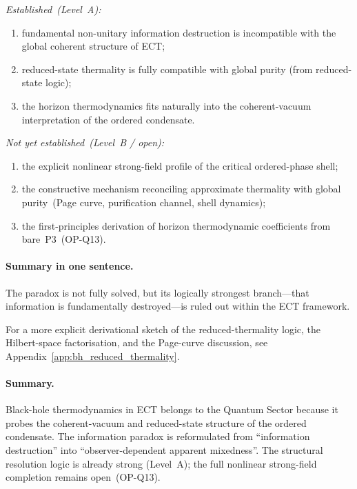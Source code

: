 \documentclass[11pt,a4paper]{article}
\numberwithin{equation}{section}
\begin{document}
\textit{Established~(Level~A):}
\begin{enumerate}[label=(\roman*)]
  \item fundamental non-unitary information destruction is
    incompatible with the global coherent structure of ECT;
  \item reduced-state thermality is fully compatible with global
    purity (from reduced-state logic);
  \item the horizon thermodynamics fits naturally into the
    coherent-vacuum interpretation of the ordered condensate.
\end{enumerate}

\textit{Not yet established~(Level~B / open):}
\begin{enumerate}[label=(\roman*)]
  \item the explicit nonlinear strong-field profile of the
    critical ordered-phase shell;
  \item the constructive mechanism reconciling approximate
    thermality with global purity~(Page curve, purification
    channel, shell dynamics);
  \item the first-principles derivation of horizon thermodynamic
    coefficients from bare~P3~(OP-Q13).
\end{enumerate}

\paragraph{Summary in one sentence.}
The paradox is not fully solved, but its logically strongest
branch---that information is fundamentally destroyed---is ruled
out within the ECT framework.

For a more explicit derivational sketch of the reduced-thermality logic,
the Hilbert-space factorisation, and the Page-curve discussion,
see Appendix~\ref{app:bh_reduced_thermality}.

\paragraph{Summary.}
Black-hole thermodynamics in ECT belongs to the Quantum Sector because
it probes the coherent-vacuum and reduced-state structure of the ordered
condensate.
The information paradox is reformulated from ``information destruction''
into ``observer-dependent apparent mixedness''.
The structural resolution logic is already strong (Level~A);
the full nonlinear strong-field completion remains open~(OP-Q13).

\end{document}

